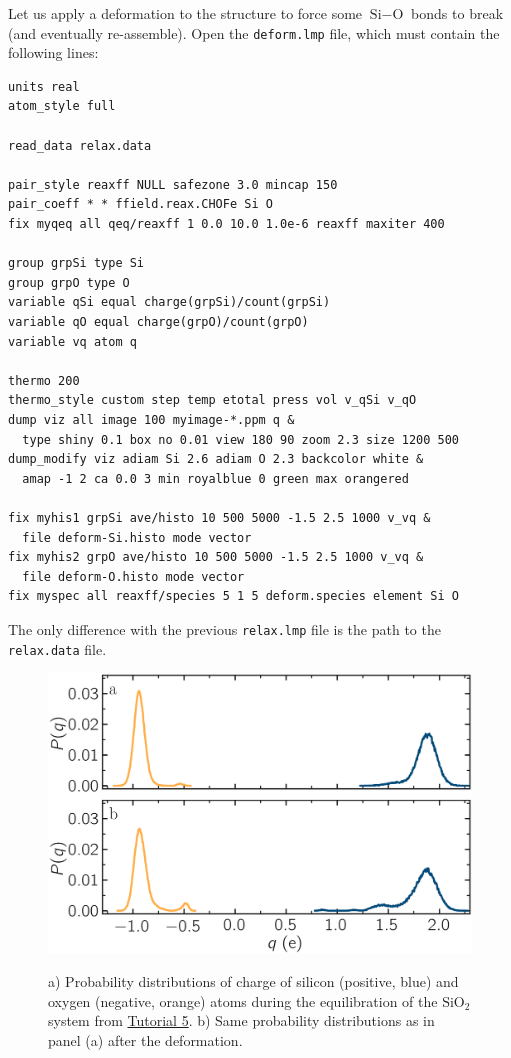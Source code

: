 \documentclass[9pt,tutorial]{livecoms}
\newcommand{\flecmd}[1]{\textcolor{command}{\texttt{#1}}} %
\begin{document}
Let us apply a deformation to the structure to force some $\text{Si}-\text{O}$
bonds to break (and eventually re-assemble).  Open the \flecmd{deform.lmp}
file, which must contain the following lines:
\begin{lstlisting}
units real
atom_style full

read_data relax.data

pair_style reaxff NULL safezone 3.0 mincap 150
pair_coeff * * ffield.reax.CHOFe Si O
fix myqeq all qeq/reaxff 1 0.0 10.0 1.0e-6 reaxff maxiter 400

group grpSi type Si
group grpO type O
variable qSi equal charge(grpSi)/count(grpSi)
variable qO equal charge(grpO)/count(grpO)
variable vq atom q

thermo 200
thermo_style custom step temp etotal press vol v_qSi v_qO
dump viz all image 100 myimage-*.ppm q &
  type shiny 0.1 box no 0.01 view 180 90 zoom 2.3 size 1200 500
dump_modify viz adiam Si 2.6 adiam O 2.3 backcolor white &
  amap -1 2 ca 0.0 3 min royalblue 0 green max orangered

fix myhis1 grpSi ave/histo 10 500 5000 -1.5 2.5 1000 v_vq &
  file deform-Si.histo mode vector
fix myhis2 grpO ave/histo 10 500 5000 -1.5 2.5 1000 v_vq &
  file deform-O.histo mode vector
fix myspec all reaxff/species 5 1 5 deform.species element Si O
\end{lstlisting}
The only difference with the previous \flecmd{relax.lmp} file is the path to
the \flecmd{relax.data} file.

\begin{figure}
\includegraphics[width=\linewidth]{SIO-distribution}\\[-4ex]
\caption{a) Probability distributions of charge of silicon (positive, blue) and oxygen
(negative, orange) atoms during the equilibration of the $\text{SiO}_2$ system
from \hyperref[reactive-silicon-dioxide-label]{Tutorial 5}.  b) Same probability distributions
as in panel (a) after the deformation.}
\label{fig:SIO-distribution}
\end{figure}
\end{document}
